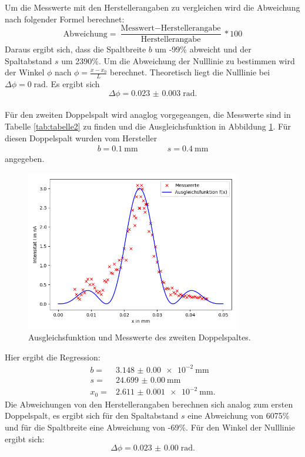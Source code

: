 Um die Messwerte mit den Herstellerangaben zu vergleichen wird die Abweichung nach folgender
Formel berechnet:
\begin{equation}
  \text{Abweichung}=\frac{\text{Messwert}-\text{Herstellerangabe}}{\text{Herstellerangabe}}*100
\end{equation}
Daraus ergibt sich, dass die Spaltbreite $b$ um -99\% abweicht  %
und der Spaltabstand $s$ um 2390\%. Um die Abweichung der Nulllinie zu bestimmen wird
der Winkel $\phi$ nach $\phi=\frac{x-x_{0}}{L}$ berechnet. Theoretisch liegt die
Nulllinie bei $\Delta \phi=0\;\text{rad} $. Es ergibt sich
\begin{equation*}
  \Delta \phi =\SI{0.023(3)}\; \text{rad}.
\end{equation*}
\\
Für den zweiten Doppelspalt wird anaglog vorgegeangen, die Messwerte sind in Tabelle
\ref{tab:tabelle2} zu finden und die Ausgleichsfunktion in Abbildung \ref{fig:plot2}.
Für diesen Doppelspalt wurden vom Hersteller
\begin{align*}
  b=\SI{0,1}{\mm}  &\;\;\;\;\;\;\;\;\;\; s=\SI{0,4}{\mm}
\end{align*}
angegeben.


\begin{figure}
  \centering
  \includegraphics[height=7cm]{Figure_2.png}
  \caption{Ausgleichsfunktion und Messwerte des zweiten Doppelspaltes.}
  \label{fig:plot2}
\end{figure}

Hier ergibt die Regression:
\begin{align*}
  b =&\SI{3.148(0)e-2}{\mm}\\
  s =&\SI{24.699(0)}{\mm}\\
  x_{0} =&\SI{2.611(1)e-2}{\mm}.
\end{align*}
Die Abweichungen von den Herstellerangaben berechnen sich analog zum
ersten Doppelspalt, es ergibt sich für den Spaltabstand $s$ eine Abweichung von
6075\% und für die Spaltbreite eine Abweichung von -69\%. Für den Winkel der
Nulllinie ergibt sich:
\begin{equation}
  \Delta \phi =\SI{0.023(0)}\; \text{rad}.
\end{equation}

